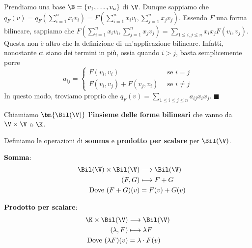 \documentclass[11pt, a4paper, titlepage, oneside]{scrbook}
\begin{document}
\Dimostrazione \nopagebreak

Prendiamo una base $\B = \{v_1, \ldots, v_n\}$ di $\V$. Dunque sappiamo che $q_F(v) = q_F(\sum_{i = 1}^n x_i v_i) = F(\sum_{i = 1}^n x_i v_i, \sum_{j = 1}^n x_j v_j)$. Essendo $F$ una forma bilineare, sappiamo che $F(\sum_{i = 1}^n x_i v_i, \sum_{j = 1}^n x_j v_j) = \sum_{1 \leq i,j \leq n} x_i x_j F(v_i, v_j)$. Questa non è altro che la definizione di un'applicazione bilineare. Infatti, nonostante ci siano dei termini in più, ossia quando $i > j$, basta semplicemente porre 
\[
a_{ij} = 
\begin{cases}
F(v_i,v_i) & \enspace \text{se } i = j \\
F(v_i,v_j) + F(v_j,v_i) & \enspace \text{se } i \neq j  
\end{cases}
\]
In questo modo, troviamo proprio che $q_F(v) = \sum_{1 \leq i \leq j \leq n} a_{ij} x_i x_j$. $\blacksquare$

\begin{Definizione}
\label{def-insieme-forme-bilineari}
Chiamiamo $\bm{\Bil(\V)}$ \textbf{l'insieme delle forme bilineari} che vanno da $\V \times \V$ a $\K$.
\end{Definizione}

Definiamo le operazioni di \textbf{somma} e \textbf{prodotto per scalare} per $\Bil(\V)$.

\bigskip

\begin{minipage}[c]{0.45\textwidth}
    \centering
    {\Large\textbf{Somma}:}
    \begin{align*}
        \hspace{0.4cm}\Bil(\V) \times \Bil(\V) &\longrightarrow \Bil(\V) \\
        \hspace{0.4cm}(F,G) &\longmapsto F + G \\
        \hspace{0.4cm}\text{Dove } (F + G)(v) &= F(v) + G(v)
    \end{align*}
\end{minipage}
\begin{minipage}[c]{0.45\textwidth}
    \centering
    {\Large\textbf{Prodotto per scalare}:}
    \begin{align*}
        \K \times \Bil(\V) &\longrightarrow \Bil(\V) \\
        (\lambda,F) &\longmapsto \lambda F \\
        \text{Dove } (\lambda F)(v) &= \lambda \cdot F(v)
    \end{align*}
\end{minipage}
\end{document}
